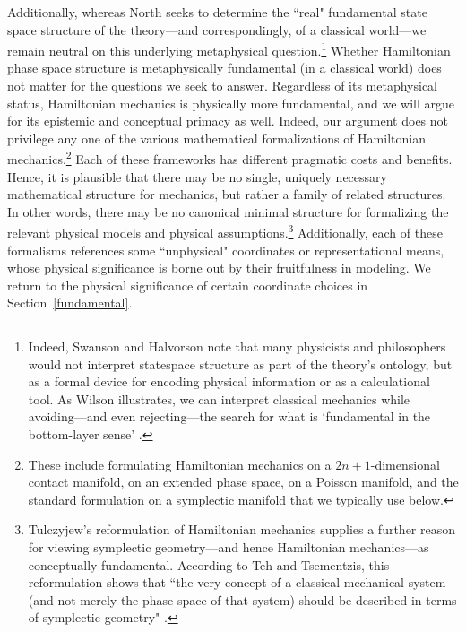 \documentclass[letterpaper]{article}
\begin{document}
Additionally, whereas North \parencites*[76]{North} seeks to determine the ``real" fundamental state space structure of the theory---and correspondingly, of a classical world---we remain neutral on this underlying metaphysical question.\footnote{Indeed, Swanson and Halvorson \parencites*[]{Swanson} note that many physicists and philosophers would not interpret statespace structure as part of the theory's ontology, but as a formal device for encoding physical information or as a calculational tool. As Wilson illustrates, we can interpret classical mechanics while avoiding---and even rejecting---the search for what is `fundamental in the bottom-layer sense' \parencites*[53]{Wilson}.} Whether Hamiltonian phase space structure is metaphysically fundamental (in a classical world) does not matter for the questions we seek to answer. Regardless of its metaphysical status, Hamiltonian mechanics is physically more fundamental, and we will argue for its epistemic and conceptual primacy as well. Indeed, our argument does not privilege any one of the various mathematical formalizations of Hamiltonian mechanics.\footnote{These include formulating Hamiltonian mechanics on a $2n+1$-dimensional contact manifold, on an extended phase space, on a Poisson manifold, and the standard formulation on a symplectic manifold that we typically use below.} Each of these frameworks has different pragmatic costs and benefits. Hence, it is plausible that there may be no single, uniquely necessary mathematical structure for mechanics, but rather a family of related structures. In other words, there may be no canonical minimal structure for formalizing the relevant physical models and physical assumptions.\footnote{Tulczyjew's reformulation of Hamiltonian mechanics supplies a further reason for viewing symplectic geometry---and hence Hamiltonian mechanics---as conceptually fundamental. According to Teh and Tsementzis, this reformulation shows that  ``the very concept of a classical mechanical system (and not merely the phase space of that system) should be described in terms of symplectic geometry" \parencites*[46]{Teh}.}  Additionally, each of these formalisms references some ``unphysical" coordinates or representational means, whose physical significance is borne out by their fruitfulness in modeling. We return to the physical significance of certain coordinate choices in Section~\ref{fundamental}.
\end{document}
